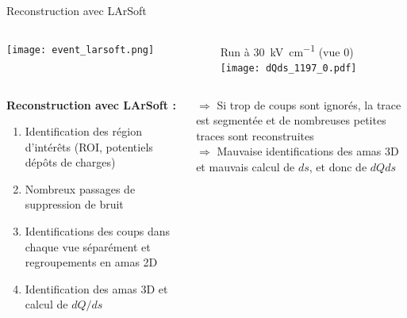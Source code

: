     \begin{frame}{Reconstruction avec LArSoft}
        \begin{scriptsize}
            \begin{columns}
                \begin{column}{0.65\textwidth}
                    \centering \texttt{[image: event\_larsoft.png]}
                \end{column}
                \begin{column}{0.35\textwidth}
                    \centering Run à \SI{30}{\kilo\volt\per\centi\meter} (vue 0)\\
                    \centering \texttt{[image: dQds\_1197\_0.pdf]}
                \end{column}
            \end{columns}\vfill
            \begin{columns}
                \begin{column}{0.5\textwidth}
                    \textbf{Reconstruction avec LArSoft :}
                    \begin{enumerate}
                        \item Identification des région d'intérêts (ROI, potentiels dépôts de charges)
                        \item Nombreux passages de suppression de bruit
                        \item Identifications des coups dans chaque vue séparément et regroupements en amas 2D
                        \item Identification des amas 3D et calcul de $dQ/ds$
                    \end{enumerate}
                \end{column}
                \begin{column}{0.5\textwidth}
                    $\Rightarrow$ Si trop de coups sont ignorés, la trace est segmentée et de nombreuses petites traces sont reconstruites\\
                    $\Rightarrow$ Mauvaise identifications des amas 3D et mauvais calcul de $ds$, et donc de $dQds$
                \end{column}
            \end{columns}
        \end{scriptsize}
    \end{frame}
    
